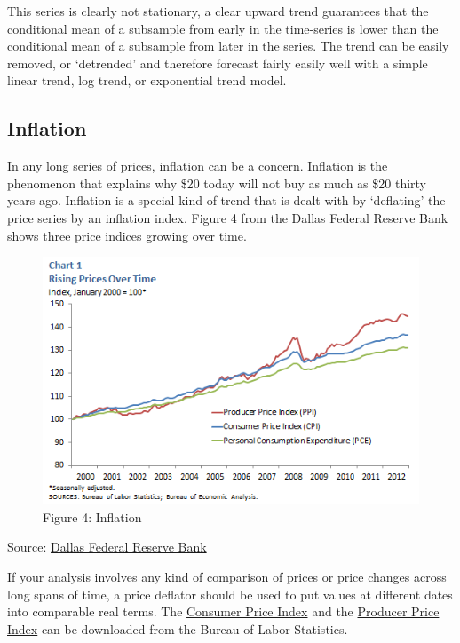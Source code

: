 \documentclass[]{book}
\theoremstyle{definition}
\theoremstyle{definition}
\theoremstyle{remark}
\begin{document}
This series is clearly not stationary, a clear upward trend guarantees
that the conditional mean of a subsample from early in the time-series
is lower than the conditional mean of a subsample from later in the
series. The trend can be easily removed, or `detrended' and therefore
forecast fairly easily well with a simple linear trend, log trend, or
exponential trend model.

\subsection{Inflation}\label{inflation}

In any long series of prices, inflation can be a concern. Inflation is
the phenomenon that explains why \$20 today will not buy as much as \$20
thirty years ago. Inflation is a special kind of trend that is dealt
with by `deflating' the price series by an inflation index. Figure 4
from the Dallas Federal Reserve Bank shows three price indices growing
over time.

\begin{figure}[htbp]
\centering
\includegraphics{images/dallasfednominal_c1.png}
\caption{Figure 4: Inflation}
\end{figure}

Source:
\href{http://www.dallasfed.org/research/basics/nominal.cfm}{Dallas
Federal Reserve Bank}

If your analysis involves any kind of comparison of prices or price
changes across long spans of time, a price deflator should be used to
put values at different dates into comparable real terms. The
\href{http://www.bls.gov/cpi/data.htm}{Consumer Price Index} and the
\href{http://www.bls.gov/ppi/data.htm}{Producer Price Index} can be
downloaded from the Bureau of Labor Statistics.
\end{document}
